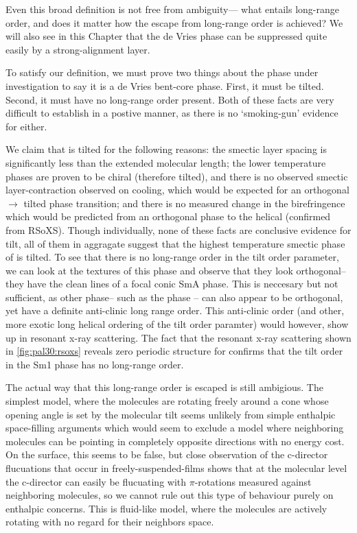 \documentclass[aagreenthesis]{subfiles}
\begin{document}
Even this broad definition is not free from ambiguity--- what entails long-range
order, and does it matter how the escape from long-range order is achieved? We will also see in this Chapter that the de Vries phase can be
suppressed quite easily by a strong-alignment layer.



To satisfy our definition, we must prove two things about the phase under
investigation to say it is a de Vries bent-core phase. First, it must be tilted.
Second, it must have no long-range order present. Both of these facts are very
difficult to establish in a postive manner, as there is no `smoking-gun'
evidence for either.

We claim that \nfour{} is tilted for the following reasons: the smectic layer spacing is
significantly less than the extended molecular length; the lower temperature
phases are proven to be chiral (therefore tilted), and there is no observed
smectic layer-contraction observed on cooling, which would be expected for an
orthogonal$\rightarrow$ tilted phase transition; and there is no measured change in the birefringence which would be predicted from an orthogonal phase to the
helical \smcpalpha{} (confirmed from RSoXS). Though individually, none of
these facts are conclusive evidence for tilt, all of them in
aggragate suggest
that the highest temperature smectic phase of \nfour{} is tilted.
To see that there is no long-range order in the tilt order parameter, we can
look at the textures of this phase and observe that they look orthogonal-- they
have the clean lines of a focal conic SmA phase. This
is neccesary but not sufficient, as other phase-- such as the \smcapa{} phase --
can also appear to be orthogonal, yet have a definite anti-clinic long range
order. This anti-clinic order (and other, more exotic long helical ordering of
the tilt order paramter) would however, show up in resonant x-ray
scattering. The fact
that the resonant x-ray scattering shown in \autoref{fig:pal30:rsoxs} reveals
zero periodic structure for \nfour{} confirms that the tilt order in the Sm1
phase has no long-range order.

The actual way that this long-range order is escaped is still ambigious. The simplest model,
where the molecules are rotating freely around a cone whose opening angle is
set by the molecular tilt seems unlikely from simple enthalpic space-filling
arguments which would seem to exclude a model where neighboring molecules can be
pointing in completely opposite directions with no energy cost. On the surface,
this seems to be false, but close observation of the c-director flucuations
that occur in freely-suspended-films shows that at the molecular level the
c-director can easily be flucuating with $\pi$-rotations measured against
neighboring molecules, so we cannot rule out this type of behaviour purely on
enthalpic concerns. This is
fluid-like model, where the molecules are actively rotating with no regard for their
neighbors space.
\end{document}
